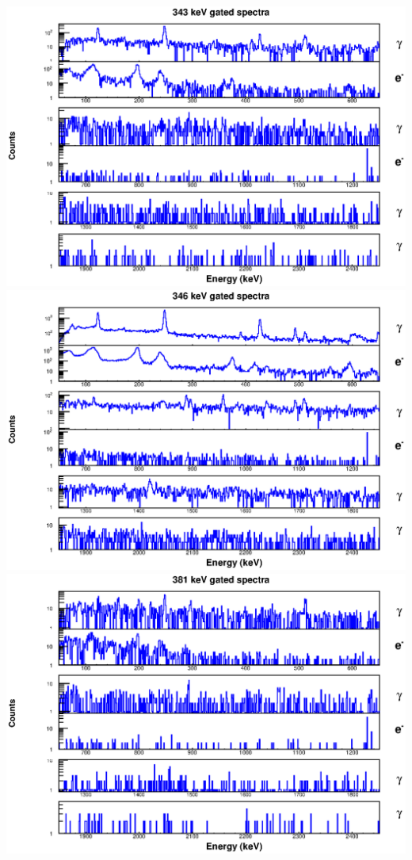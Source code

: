 \includegraphics[scale=0.8]{154Gd_Appendix/343_combined.eps}
\includegraphics[scale=0.8]{154Gd_Appendix/346_combined.eps}
\includegraphics[scale=0.8]{154Gd_Appendix/381_combined.eps}
